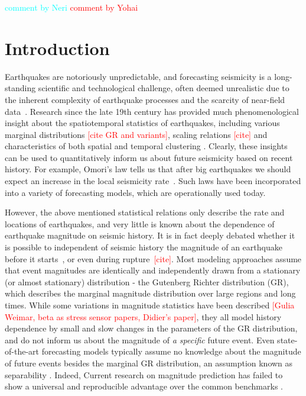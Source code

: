 \documentclass[pdflatex]{sn-jnl}
\newcommand{\yohai}[1]{{\textcolor{red}{#1}}}
\newcommand{\neri}[1]{{\textcolor{cyan}{#1}}}
\begin{document}
\neri{comment by Neri} \newline
\yohai{comment by Yohai}


\section{Introduction} \label{sec:introduction}
Earthquakes are notoriously unpredictable, and forecasting seismicity is a long-standing scientific and technological challenge, often deemed unrealistic due to the inherent complexity of earthquake processes and the scarcity of near-field data~\cite{bernard_earthquake_1999, geller_earthquakes_1997}. 
Research since the late 19th century has provided much phenomenological insight about the spatiotemporal statistics of earthquakes, including various marginal distributions \yohai{[cite GR and variants]}, scaling relations \yohai{[cite]} and characteristics of both spatial and temporal clustering \cite{omori_after-shocks_1894, kagan_short-term_2004, ben-zion_localization_2020}. Clearly, these insights can be used to quantitatively inform us about future seismicity based on recent history. For example, Omori's law tells us that after big earthquakes we should expect an increase in the local seismicity rate~\cite{omori_after-shocks_1894}. Such laws have been incorporated into a variety of forecasting models, which are operationally used today\cite{ogata_statistical_1988, hardebeck_aftershock_2024, devries_deep_2018, king_static_1994}.

However, the above mentioned statistical relations only describe the rate and locations of earthquakes, and very little is known about the dependence of earthquake magnitude on seismic history.
It is in fact deeply debated whether it is possible to independent of seismic history the magnitude of an earthquake before it starts~\cite{gutenberg_frequency_1944, kagan_seismic_2002, ogata_exploring_2018}, or even during rupture~\yohai{[cite]}.
Most modeling approaches assume that event magnitudes are identically and independently drawn from a stationary (or almost stationary) distribution - the Gutenberg Richter distribution (GR), which describes the marginal magnitude distribution over large regions and long times. 
While some variations in magnitude statistics have been described \yohai{[Gulia Weimar, beta as stress sensor papers, Didier's paper]}, they all model history dependence by small and slow changes in the parameters of the GR distribution, and do not inform us about the magnitude of \textit{a specific} future event. Even state-of-the-art forecasting models typically assume no knowledge about the magnitude of future events besides the marginal GR distribution, an assumption known as separability \cite{schoenberg_testing_2004}. Indeed, Current research on magnitude prediction has failed to show a universal and reproducible advantage over the common benchmarks \cite{shcherbakov_forecasting_2019, ogata_exploring_2018, stockman_forecasting_2023,  panakkat_neural_2007}.
\end{document}
